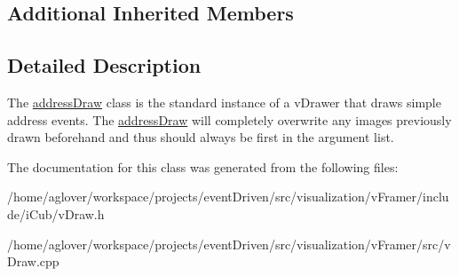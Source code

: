 \subsection*{Additional Inherited Members}


\subsection{Detailed Description}
The \hyperlink{classemorph_1_1addressDraw}{address\-Draw} class is the standard instance of a v\-Drawer that draws simple address events. The \hyperlink{classemorph_1_1addressDraw}{address\-Draw} will completely overwrite any images previously drawn beforehand and thus should always be first in the argument list. 

The documentation for this class was generated from the following files\-:\begin{DoxyCompactItemize}
\item 
/home/aglover/workspace/projects/event\-Driven/src/visualization/v\-Framer/include/i\-Cub/v\-Draw.\-h\item 
/home/aglover/workspace/projects/event\-Driven/src/visualization/v\-Framer/src/v\-Draw.\-cpp\end{DoxyCompactItemize}
